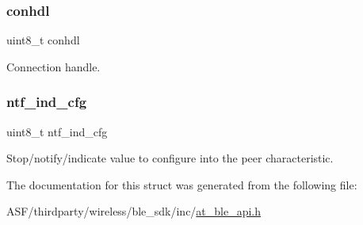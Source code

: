 \subsubsection{\texorpdfstring{conhdl}{conhdl}}
{\footnotesize\ttfamily uint8\+\_\+t conhdl}



Connection handle. 

\mbox{\label{structat__ble__htpt__cfg__indntf__ind__t_a3af49eea3acf55ffcec221564edf2077}} 
\subsubsection{\texorpdfstring{ntf\_ind\_cfg}{ntf\_ind\_cfg}}
{\footnotesize\ttfamily uint8\+\_\+t ntf\+\_\+ind\+\_\+cfg}



Stop/notify/indicate value to configure into the peer characteristic. 



The documentation for this struct was generated from the following file\+:\begin{DoxyCompactItemize}
\item 
A\+S\+F/thirdparty/wireless/ble\+\_\+sdk/inc/\mbox{\hyperlink{at__ble__api_8h}{at\+\_\+ble\+\_\+api.\+h}}\end{DoxyCompactItemize}
